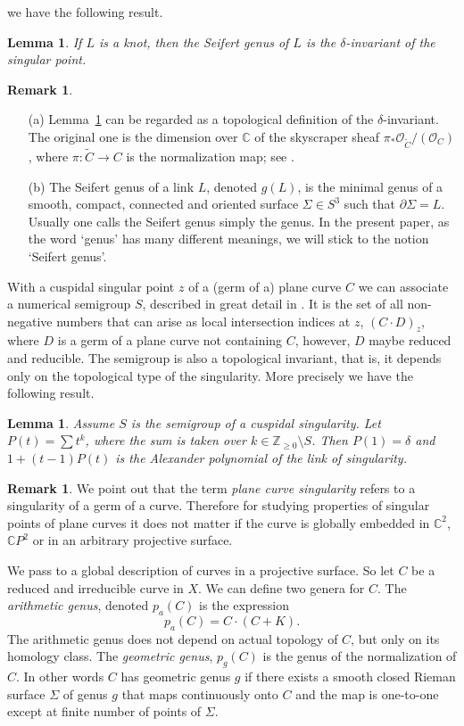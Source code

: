 \documentclass[11pt]{amsart}
\numberwithin{equation}{section}
\theoremstyle{plain}
\newtheorem{lemma}[equation]{Lemma}
\theoremstyle{definition}
\newtheorem{remark}[equation]{Remark}
\begin{document}
we have the following result.
\begin{lemma}\label{lem:deltaandgenus}
If $L$ is a knot, then the Seifert genus of $L$ is the $\delta$-invariant of the singular point.
\end{lemma}
\begin{remark}\
\begin{itemize}
\item[(a)] Lemma~\ref{lem:deltaandgenus} can be regarded as a topological definition of the $\delta$-invariant. The original one is 
the dimension over ${\mathbb C}$ of
the skyscraper sheaf $\pi_*\mathcal{O}_{{\widetilde{{C}}}}/(\mathcal{O}_C)$, 
where $\pi\colon{\widetilde{{C}}}\to C$ is the normalization map; see \cite[Section II.11]{BH}.
\item[(b)] The Seifert genus of a link $L$, denoted $g(L)$, 
is the minimal genus of a smooth, compact, connected and oriented surface $\Sigma\in S^3$ such
that $\partial\Sigma=L$. Usually one calls the Seifert genus simply the genus. In the present paper, as the word `genus' has many different meanings,
we will stick to the notion `Seifert genus'.
\end{itemize}
\end{remark}
With a cuspidal singular point $z$ of a (germ of a)
plane curve $C$ we can associate a numerical semigroup $S$, described in great detail in \cite[Chapter 4]{Wall}. 
It is the set of all non-negative numbers that can
arise as local intersection indices at $z$, $(C\cdot D)_z$, where $D$ is a germ of a plane curve not 
containing $C$, however, $D$ maybe reduced and reducible.
The semigroup is also a topological invariant, that is, it depends only on the topological type of the singularity. More precisely
we have the following result.
\begin{lemma}\label{lem:semigroup}
Assume $S$ is the semigroup of a cuspidal singularity.
Let $P(t)=\sum t^{k}$, where the sum is taken over $k\in{\mathbb Z}_{\ge 0}\setminus S$. Then $P(1)=\delta$ and 
$1+(t-1)P(t)$ is the Alexander polynomial of the link of singularity. 
\end{lemma}
\begin{remark}
We point out that the term \emph{plane curve singularity} refers to a singularity of a germ of a curve.
Therefore for studying
properties of singular points of plane curves it does not matter
if the curve is globally embedded in ${\mathbb C}^2$, ${\mathbb C} P^2$ or in an arbitrary projective surface.
\end{remark}
\smallskip
We pass to a global description of curves in a projective surface. So let $C$ be a reduced and irreducible curve in $X$.
We can define two genera for $C$. The \emph{arithmetic genus}, denoted $p_a(C)$ is the expression
\begin{equation}\label{eq:arithmeticgenus}
p_a(C)=C\cdot(C+K).
\end{equation}
The arithmetic genus does not depend on actual topology of $C$, but only on its homology class. The \emph{geometric genus}, $p_g(C)$ is the genus
of the normalization of $C$. In other words $C$ has geometric genus $g$ if there exists a smooth closed Rieman surface $\Sigma$ of
genus $g$ that maps continuously onto $C$ and the map is one-to-one except at finite number of points of $\Sigma$.
\end{document}
